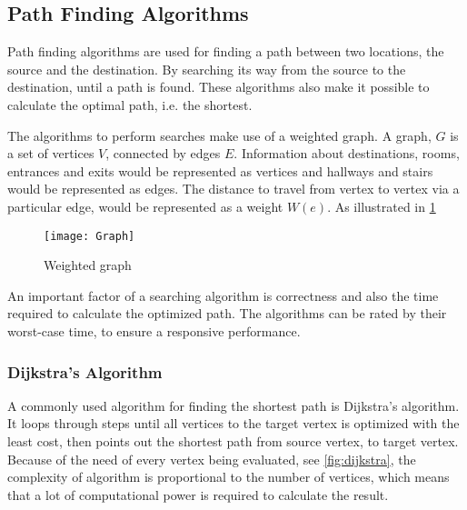 




\subsection{Path Finding Algorithms}

  Path finding algorithms are used for finding a path between two locations, the source and the destination. By searching its way from the source to the destination, until a path is found. These algorithms also make it possible to calculate the optimal path, i.e. the shortest. \cite{Cormen2009}

  The algorithms to perform searches make use of a weighted graph. A graph, $G$ is a set of vertices $V$, connected by edges $E$.
  Information about destinations, rooms, entrances and exits would be represented as vertices and hallways and stairs would be represented as edges. The distance to travel from vertex to vertex via a particular edge, would be represented as a weight $W(e)$. As illustrated in \cref{fig:graph}

  \begin{figure}[ht!]
    \centering
    \texttt{[image: Graph]}
    \caption{Weighted graph}
    \label{fig:graph}
  \end{figure}

  An important factor of a searching algorithm is correctness and also the time required to calculate the optimized path.
  The algorithms can be rated by their worst-case time, to ensure a responsive performance.

  \subsubsection{Dijkstra's Algorithm}

  A commonly used algorithm for finding the shortest path is Dijkstra's algorithm. It loops through steps until all vertices to the target vertex is optimized with the least cost, then points out the shortest path from source vertex, to target vertex. Because of the need of every vertex being evaluated, see \cref{fig:dijkstra}, the complexity of algorithm is proportional to the number of vertices, which means that a lot of computational power is required to calculate the result. \cite{Dijkstr1959}

